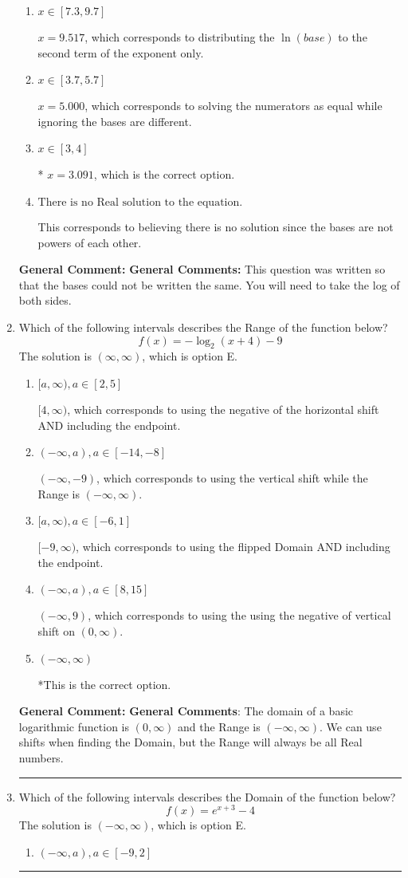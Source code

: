 \documentclass{extbook}[14pt]
\newcommand{\litem}[1]{\item #1

\rule{\textwidth}{0.4pt}}
\begin{document}
\begin{enumerate}
{\begin{enumerate}[label=\Alph*.]
$x = 1.624$, which corresponds to distributing the $\ln(base)$ to the first term of the exponent only.
\item \( x \in [7.3, 9.7] \)

$x = 9.517$, which corresponds to distributing the $\ln(base)$ to the second term of the exponent only.
\item \( x \in [3.7, 5.7] \)

$x = 5.000$, which corresponds to solving the numerators as equal while ignoring the bases are different.
\item \( x \in [3, 4] \)

* $x = 3.091$, which is the correct option.
\item \( \text{There is no Real solution to the equation.} \)

This corresponds to believing there is no solution since the bases are not powers of each other.
\end{enumerate}

\textbf{General Comment:} \textbf{General Comments:} This question was written so that the bases could not be written the same. You will need to take the log of both sides.
}
\litem{
Which of the following intervals describes the Range of the function below?
\[ f(x) = -\log_2{(x+4)}-9 \]The solution is \( (\infty, \infty) \), which is option E.\begin{enumerate}[label=\Alph*.]
\item \( [a, \infty), a \in [2, 5] \)

$[4, \infty)$, which corresponds to using the negative of the horizontal shift AND including the endpoint.
\item \( (-\infty, a), a \in [-14, -8] \)

$(-\infty, -9)$, which corresponds to using the vertical shift while the Range is $(-\infty, \infty)$.
\item \( [a, \infty), a \in [-6, 1] \)

$[-9, \infty)$, which corresponds to using the flipped Domain AND including the endpoint.
\item \( (-\infty, a), a \in [8, 15] \)

$(-\infty, 9)$, which corresponds to using the using the negative of vertical shift on $(0, \infty)$.
\item \( (-\infty, \infty) \)

*This is the correct option.
\end{enumerate}

\textbf{General Comment:} \textbf{General Comments}: The domain of a basic logarithmic function is $(0, \infty)$ and the Range is $(-\infty, \infty)$. We can use shifts when finding the Domain, but the Range will always be all Real numbers.
}
\litem{
Which of the following intervals describes the Domain of the function below?
\[ f(x) = e^{x+3}-4 \]The solution is \( (-\infty, \infty) \), which is option E.\begin{enumerate}[label=\Alph*.]
\item \( (-\infty, a), a \in [-9, 2] \)


\end{enumerate}}
\end{enumerate}
\end{document}
